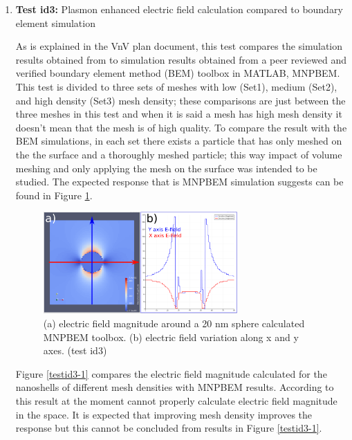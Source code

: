 \documentclass[12pt, titlepage]{article}
\begin{document}
\begin{enumerate}
	
	\item{\textbf{Test id3:} Plasmon enhanced electric field calculation compared to boundary element simulation\\}
	
	As is explained in the VnV plan document, this test compares the simulation results obtained from \progname{} to simulation results obtained from a peer reviewed and verified boundary element method (BEM) toolbox in MATLAB, MNPBEM. 
	This test is divided to three sets of meshes with low (Set1), medium (Set2), and high density (Set3) mesh density; these comparisons are just between the three meshes in this test and when it is said a mesh has high mesh density it doesn't mean that the mesh is of high quality.
	To compare the \progname{} result with the BEM simulations, in each set there exists a particle that has only meshed on the the surface and a thoroughly meshed particle; this way impact of volume meshing and only applying the mesh on the surface was intended to be studied.  
	The expected response that is  MNPBEM simulation suggests can be found in Figure \ref{mnpbem}.
	
	 
	\begin{figure} \centering \includegraphics[width=0.7\textwidth]{mnpbem.png}
		\caption{(a) electric field magnitude around a 20 nm sphere calculated MNPBEM toolbox. (b) electric field variation along x and y axes. (test id3)} \label{mnpbem} 
	\end{figure}

    Figure \ref{testid3-1}  compares the \progname{} electric field magnitude calculated for the nanoshells of different mesh densities with MNPBEM results. According to this result \progname{} at the moment cannot properly calculate electric field magnitude in the space. It is expected that improving mesh density improves the response but this cannot be concluded from results in Figure \ref{testid3-1}.  
    

\end{enumerate}
\end{document}
